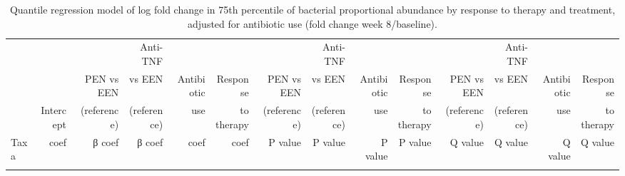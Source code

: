 \newpage
{\scriptsize
	\begin{landscape}
	\renewcommand{\arraystretch}{0.7} \setlength{\tabcolsep}{3pt}
	\begin{longtable}{ | l | r | r | r | r | r | r  | r | r | r | r | r | r  | r  |}
		\caption[Quantile regression model of log fold change in 75th percentile of bacterial proportional abundance by response to therapy and treatment, adjusted for antibiotic use (fold change week 8/baseline)]{Quantile regression model of log fold change in 75th percentile of bacterial proportional abundance by response to therapy and treatment, adjusted for antibiotic use (fold change week 8/baseline).} 
		\label{TS9} \\
		
		&  &	 &	Anti-TNF   & &	 &	  &	Anti-TNF & && 	& Anti-TNF  & 	&   \\
		
		&  &	PEN vs EEN &	vs EEN  &	Antibiotic &	Response &	 PEN vs EEN  &	vs EEN &	Antibiotic&	Response& PEN vs EEN	& vs EEN & 	Antibiotic	& Response  \\
		
		& Intercept & (reference) &	(reference) &	use & to therapy &(reference) &(reference) &	use &to therapy	&(reference)	& (reference)& use	& to therapy  \\
		\hline 
		Taxa & coef & β coef & β coef & coef & coef & P value & P value & P value & P value & Q value & Q value & Q value & Q value \\ 
		\hline 
		\endfirsthead
		
		
		\endfoot
		
		\hline 
		\endlastfoot
		

\end{longtable}
\end{landscape}}
